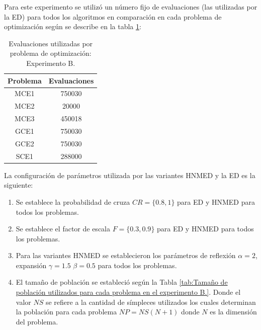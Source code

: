 Para este experimento se utilizó un número fijo de evaluaciones (las utilizadas por la ED) para todos los algoritmos en comparación en cada problema de optimización según se describe en la tabla \ref{tab:Evaluaciones utilizadas por problema de optimización: Experimento B.}:

\begin{table}[]
	\centering
	\caption{Evaluaciones utilizadas por problema de optimización: Experimento B.}
	\label{tab:Evaluaciones utilizadas por problema de optimización: Experimento B.}
	\begin{tabular}{cc}
		\textbf{Problema} &   \textbf{Evaluaciones}     \\
		\hline
		MCE1   &   750030       \\
		MCE2   &   20000       \\
		MCE3   &   450018      \\
		GCE1   &   750030       \\
		GCE2   &   750030      \\
		SCE1   &   288000       \\
	\end{tabular}
\end{table}
La configuración de parámetros utilizada por las variantes HNMED y la ED es la siguiente:
\begin{enumerate}
	\item Se establece la probabilidad de cruza $CR=\{0.8, 1\}$ para ED y HNMED para todos los problemas.
	\item Se establece el factor de escala $F=\{0.3, 0.9\}$ para ED y HNMED para todos los problemas.
	\item Para las variantes HNMED se establecieron los parámetros de reflexión $\alpha=2$, expansión $\gamma=1.5$ $\beta=0.5$ para todos los problemas.
	\item El tamaño de población se estableció según la Tabla \ref{tab:Tamaño de población utilizados para cada problema en el experimento B.}. Donde el valor $NS$ se refiere a la cantidad de símpleces utilizados los cuales determinan la población para cada problema $NP=NS(N+1)$ donde $N$  es la dimensión del problema.
\end{enumerate}

